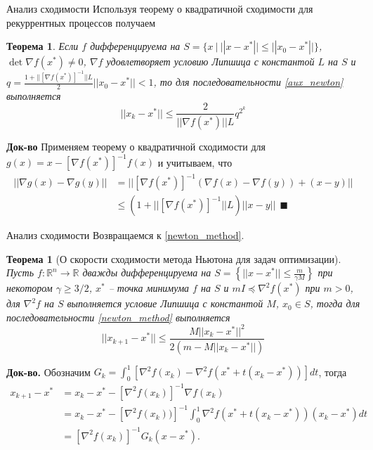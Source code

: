 \documentclass[10pt]{beamer}
\newcounter{thm}
\newtheorem{theorem_ru}[thm]{Теорема}
\begin{document}
\begin{frame}{Анализ сходимости}
Используя теорему о квадратичной сходимости для рекуррентных процессов получаем
\begin{theorem_ru}
Если $f$ дифференцируема на $S=\{x~|~||x-x^*||\leq ||x_0-x^*||\}$, $\det \nabla f(x^*)\neq 0$, $\nabla f$ удовлетворяет условию Липшица с константой $L$ на $S$ и $q=\frac{1+||[\nabla f(x^*)]^{-1}||L}{2}||x_0-x^*||<1$, то для последовательности \eqref{aux_newton} выполняется
$$
||x_k-x^*||\leq \frac{2}{||\nabla f(x^*)||L}q^{2^k}
$$
\end{theorem_ru}
\pause
\textbf{Док-во} Применяем теорему о квадратичной сходимости для $g(x)=x-[\nabla f(x^*)]^{-1}f(x)$ и учитываем, что
\begin{align*}
||\nabla g(x)-\nabla g(y)||&=||[\nabla f(x^*)]^{-1}(\nabla f(x)-\nabla f(y))+(x-y)||\\
&\leq (1+||[\nabla f(x^*)]^{-1}||L)||x-y||~~\blacksquare
\end{align*}
\end{frame}

\begin{frame}{Анализ сходимости}
Возвращаемся к \eqref{newton_method}.
\begin{theorem_ru}[О скорости сходимости метода Ньютона для задач оптимизации]
Пусть $f:\mathbb{R}^n\rightarrow \mathbb{R}$ дважды дифференцируема на $S=\left\{||x-x^*||\leq\frac{m}{\gamma M}\right\}$ 
при некотором $\gamma\geq 3/2$, $x^*$ -- точка минимума $f$ на $S$ и $mI\preceq\nabla^2 f(x^*)$ при $m>0$, для $\nabla^2 f$ на $S$ выполняется условие Липшица с константой $M$, $x_0\in S$, 
тогда для последовательности \eqref{newton_method} выполняется
$$
||x_{k+1}-x^*||\leq \frac{M||x_k-x^*||^2}{2(m-M||x_k-x^*||)}
$$
\end{theorem_ru}
\pause
\textbf{Док-во.} Обозначим $G_k= \int_0^1[\nabla^2 f(x_k)-\nabla^2 f(x^*+t(x_k-x^*))]dt$, тогда
\begin{align*}
x_{k+1}-x^*&=x_k-x^*-[\nabla^2 f(x_k)]^{-1}\nabla f(x_k)\\
&=x_k-x^*-[\nabla^2 f(x_k))]^{-1}\int_0^1\nabla^2 f(x^*+t(x_k-x^*))(x_k-x^*)dt \\
&=[\nabla^2 f(x_k)]^{-1}G_k(x-x^*).
\end{align*}
\end{frame}
\end{document}
